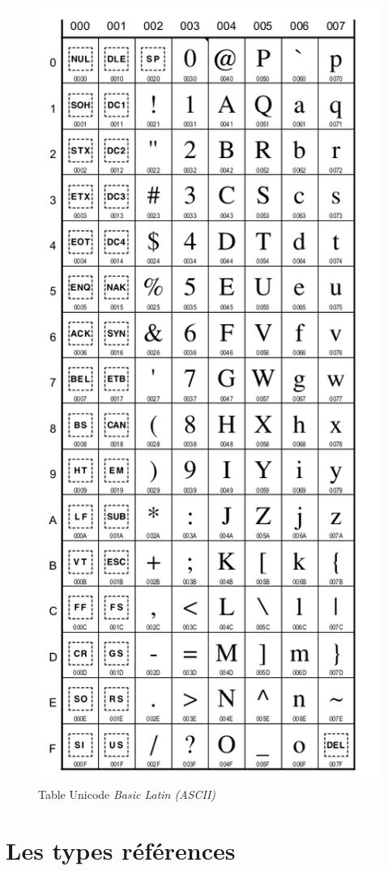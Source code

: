 \begin{figure}[p]
	\centering
	\includegraphics[width=.75\linewidth]{images/unicode-latin-2.png}
	\caption{Table Unicode \textit{Basic Latin (ASCII)}}
	\label{fig:tableunicode}
\end{figure}







\clearpage
{}
\section{Les types références}

